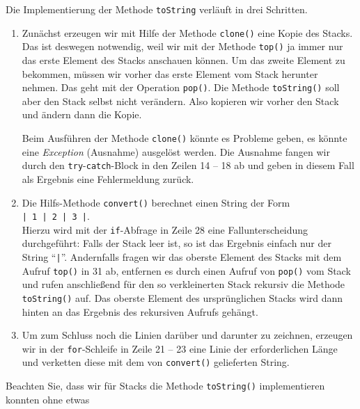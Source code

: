 \begin{enumerate}
      Die Implementierung der Methode \texttt{toString} verl\"auft in drei Schritten.
      \begin{enumerate}
      \item Zun\"achst erzeugen wir mit Hilfe der Methode \texttt{clone()} eine Kopie des
            Stacks.  Das ist deswegen notwendig, weil wir mit der Methode \texttt{top()}
            ja immer nur das erste Element des Stacks anschauen k\"onnen.  Um das zweite
            Element zu bekommen, m\"ussen wir vorher das erste Element vom Stack herunter
            nehmen.  Das geht mit der Operation \texttt{pop()}.  Die Methode
            \texttt{toString()} soll aber den Stack selbst nicht ver\"andern.  Also kopieren
            wir vorher den Stack und \"andern dann die Kopie.

            Beim Ausf\"uhren der Methode \texttt{clone()} k\"onnte es Probleme geben, es
            k\"onnte eine \emph{Exception} (Ausnahme) ausgel\"ost werden.  Die Ausnahme
            fangen wir durch den \texttt{try}-\texttt{catch}-Block in den Zeilen 14 -- 18
            ab und geben in diesem Fall als Ergebnis eine Fehlermeldung zur\"uck.
      \item Die Hilfs-Methode \texttt{convert()} berechnet einen String der Form \\[0.1cm]
            \hspace*{1.3cm} \texttt{| 1 | 2 | 3 |}. \\[0.1cm]
            Hierzu wird mit der \texttt{if}-Abfrage in Zeile 28 eine Fallunterscheidung 
            durchgef\"uhrt: Falls der Stack leer ist, so ist das Ergebnis einfach nur der
            String ``\texttt{|}''.  Andernfalls fragen wir das oberste Element des Stacks
            mit dem Aufruf \texttt{top()} in 31 ab, entfernen es durch einen Aufruf von
            \texttt{pop()} vom Stack und rufen anschlie{\ss}end f\"ur den so verkleinerten Stack
            rekursiv die Methode \texttt{toString()} auf.  Das oberste Element des
            urspr\"unglichen Stacks wird dann hinten an das Ergebnis des rekursiven Aufrufs geh\"angt.
      \item Um zum Schluss noch die Linien dar\"uber und darunter zu zeichnen, erzeugen wir
            in der \texttt{for}-Schleife in Zeile 21 -- 23 eine Linie der erforderlichen
            L\"ange und verketten diese mit dem von \texttt{convert()} gelieferten String.
      \end{enumerate}
\end{enumerate}
Beachten Sie, dass wir f\"ur Stacks die Methode \texttt{toString()} implementieren konnten ohne etwas
